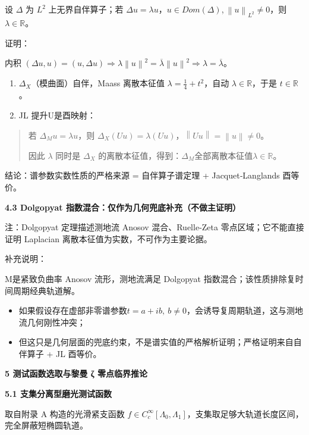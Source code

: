 \documentclass[11pt,a4paper]{ctexart}
\begin{document}
设 \(\Delta\) 为 \(L^{2}\) 上无界自伴算子；若
\(\Delta u = \lambda u\)，\(u \in Dom(\Delta)\),\(\ \left\| u \right\|_{L^{2}} \neq 0\)，则
\(\lambda \in \mathbb{R}\)。

证明：

内积
\((\Delta u,u) = (u,\Delta u) \Rightarrow \lambda\left\| u \right\|^{2} = \overline{\lambda}\left\| u \right\|^{2} \Rightarrow \lambda = \overline{\lambda}\)。

\begin{enumerate}
\def\labelenumi{\arabic{enumi}.}
\item
  \(\Delta_{X}\)（模曲面）自伴，Maass 离散本征值
  \(\lambda = \frac{1}{4} + t^{2}\)，自动
  \(\lambda \in \mathbb{R}\)，于是 \(t \in \mathbb{R}\)。
\item
  JL 提升U是酉映射：
\end{enumerate}

\begin{quote}
若 \(\Delta_{M}u = \lambda u\)，则
\(\Delta_{X}(Uu) = \lambda(Uu)\)，\(\left\| Uu \right\| = \left\| u \right\| \neq 0\)。

因此 \(\lambda\) 同时是 \(\Delta_{X}\)
的离散本征值，得到：\(\Delta_{M}\)全部离散本征值\(\lambda\mathbb{\in R}\)。
\end{quote}

结论：谱参数实数性质的严格来源 = 自伴算子谱定理 + Jacquet‑Langlands
酉等价。

\textbf{4.3 Dolgopyat 指数混合：仅作为几何兜底补充（不做主证明）}

注：Dolgopyat 定理描述测地流 Anosov 混合、Ruelle‑Zeta
零点区域；它不能直接证明 Laplacian 离散本征值为实数，不可作为主要论据。

补充说明：

M是紧致负曲率 Anosov 流形，测地流满足 Dolgopyat
指数混合；该性质排除复时间周期经典轨道解。

\begin{itemize}
\item
  如果假设存在虚部非零谱参数\(t = a + ib,\ b \neq 0\)，会诱导复周期轨道，这与测地流几何刚性冲突；
\item
  但这只是几何层面的兜底约束，不是谱实值的严格解析证明；严格证明来自自伴算子
  + JL 酉等价。
\end{itemize}

\textbf{5 测试函数选取与黎曼 ζ 零点临界推论}

\textbf{5.1 支集分离型磨光测试函数}

取自附录 A 构造的光滑紧支函数
\(f \in C_{c}^{\infty}\left\lbrack \Lambda_{0},\Lambda_{1} \right\rbrack\)，支集取足够大轨道长度区间，完全屏蔽短椭圆轨道。
\end{document}

